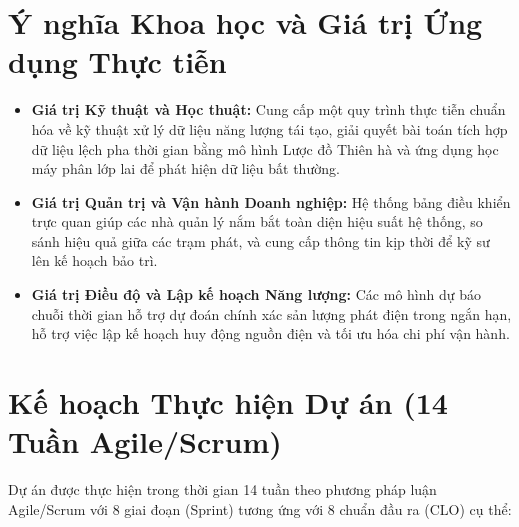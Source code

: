 \documentclass[12pt, a4paper]{report}
\begin{document}
\section{Ý nghĩa Khoa học và Giá trị Ứng dụng Thực tiễn}
\label{sec:ynghia}

\begin{itemize}[noitemsep]
    \item \textbf{Giá trị Kỹ thuật và Học thuật:} Cung cấp một quy trình thực tiễn chuẩn hóa về kỹ thuật xử lý dữ liệu năng lượng tái tạo, giải quyết bài toán tích hợp dữ liệu lệch pha thời gian bằng mô hình Lược đồ Thiên hà và ứng dụng học máy phân lớp lai để phát hiện dữ liệu bất thường.
    \item \textbf{Giá trị Quản trị và Vận hành Doanh nghiệp:} Hệ thống bảng điều khiển trực quan giúp các nhà quản lý nắm bắt toàn diện hiệu suất hệ thống, so sánh hiệu quả giữa các trạm phát, và cung cấp thông tin kịp thời để kỹ sư lên kế hoạch bảo trì.
    \item \textbf{Giá trị Điều độ và Lập kế hoạch Năng lượng:} Các mô hình dự báo chuỗi thời gian hỗ trợ dự đoán chính xác sản lượng phát điện trong ngắn hạn, hỗ trợ việc lập kế hoạch huy động nguồn điện và tối ưu hóa chi phí vận hành.
\end{itemize}

\newpage
\section{Kế hoạch Thực hiện Dự án (14 Tuần Agile/Scrum)}
\label{sec:kehoach}

Dự án được thực hiện trong thời gian 14 tuần theo phương pháp luận Agile/Scrum với 8 giai đoạn (Sprint) tương ứng với 8 chuẩn đầu ra (CLO) cụ thể:
\end{document}
